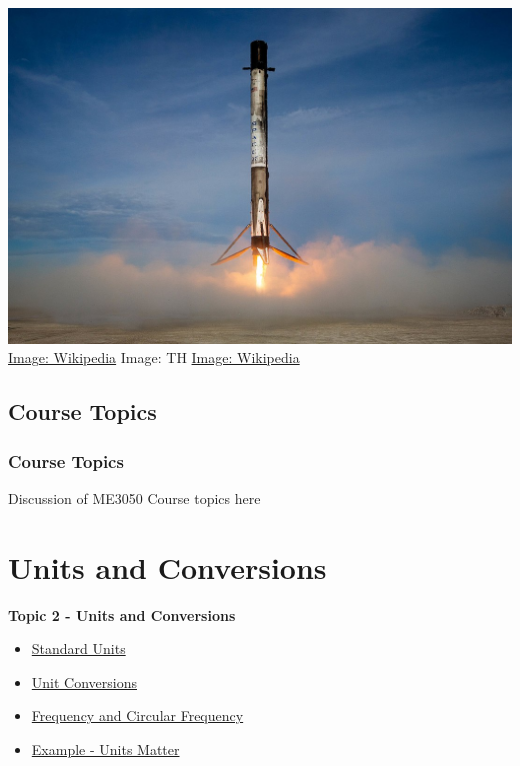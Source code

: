 \documentclass[fleqn]{beamer} %
\newcommand{\sectionIItitle}{Units and Conversions}
\newcommand{\sectionIsubsectionIVtitle}{Course Topics}
\newcommand{\sectionIIsubsectionItitle}{Standard Units}
\newcommand{\sectionIIsubsectionIItitle}{Unit Conversions}
\newcommand{\sectionIIsubsectionIIItitle}{Frequency and Circular Frequency}
\newcommand{\sectionIIsubsectionIVtitle}{Example - Units Matter}
\begin{document}
\begin{frame}
				\includegraphics[scale=.1]{images/falcon9_fig2.jpg} \\
				{\tiny\href{https://en.wikipedia.org/wiki/Phantom_(UAV)}{Image: Wikipedia} \hspace{20mm}Image: TH \hspace{20mm}\href{https://en.wikipedia.org/wiki/SpaceX\#/media/File:CRS-18_Mission_(48380511427).jpg}{Image: Wikipedia} }

				\btVFill
			\end{frame}	

		\subsection{\sectionIsubsectionIVtitle}\label{sectionIsubsectionIV}	

			\begin{frame}
				\frametitle{\sectionIsubsectionIVtitle}
				\bigskip
				Discussion of ME3050 Course topics here

				\btVFill
			\end{frame}
	
	\section{\sectionIItitle}\label{sectionII}

		\begin{frame}
			\large \textbf{Topic 2 - \sectionIItitle} \vspace{3mm}\\

			\begin{itemize}
				\item \hyperlink{sectionIIsubsectionI}{\sectionIIsubsectionItitle} \vspc %
				\item \hyperlink{sectionIIsubsectionII}{\sectionIIsubsectionIItitle} \vspc %
				\item \hyperlink{sectionIIsubsectionIII}{\sectionIIsubsectionIIItitle} \vspc %
				\item \hyperlink{sectionIIsubsectionIV}{\sectionIIsubsectionIVtitle} \vspc %
			\end{itemize}

		\end{frame}
\end{document}
